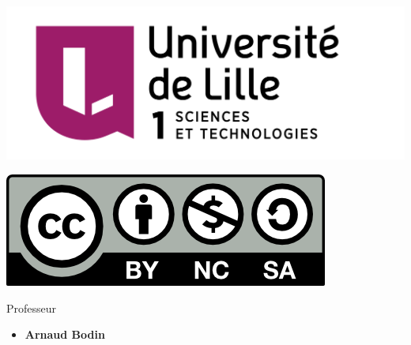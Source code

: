 








\begin{frame}

\thispagestyle{empty}    

  \hspace*{-20ex}
  \begin{minipage}{0.6\textwidth}
  \begin{center}
    \vspace*{5ex}   


    \bigskip

    \includegraphics[scale=0.13]{../divers/Logo-Univ-Lille-1-new.png}

    \vspace*{5ex}

    \includegraphics[scale=0.5]{../divers/by-nc-sa.png}
  \end{center}
  \end{minipage}  
  \hfil
  \begin{minipage}{0.65\textwidth}

   \vspace*{5ex}
  Professeur
  \begin{itemize}
    \item {\bf Arnaud Bodin}  
  \end{itemize} 
  

\end{minipage}
\end{frame}
